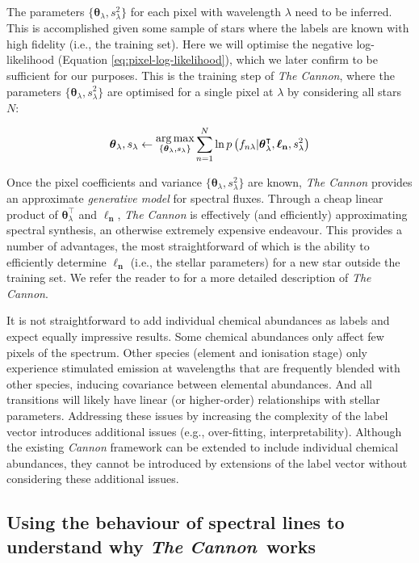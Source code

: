 \documentclass[useAMS,usenatbib]{mn2e}
\newcommand\tc{\textit{The Cannon}}
\newcommand\lv{\mathbf{\boldsymbol\ell_n}}
\newcommand\cv{{\boldsymbol\theta}_\lambda}
\newcommand\given{|}
\newcommand{\set}[1]{$\{#1\}$}
\begin{document}
The parameters \set{\cv,s_\lambda^2} for each pixel with wavelength $\lambda$
need to be inferred. This is accomplished given some sample of stars where 
the labels are known with high fidelity (i.e., the training set). Here we will 
optimise the negative log-likelihood (Equation \ref{eq:pixel-log-likelihood}),
which we later confirm to be sufficient for our purposes. This is the training 
step of \tc{}, where the parameters \set{\cv,s_\lambda^2} are optimised 
for a single pixel at $\lambda$ by considering all stars $N$:


\begin{equation}
\cv,s_\lambda \leftarrow \substack{\mbox{arg\,max}\\{\{\cv , s_\lambda\}}} \sum_{n=1}^N \ln{p}\left(f_{n\lambda}\given\cv^\intercal,\lv,s_\lambda^2\right)
\end{equation}

Once the pixel coefficients and variance \set{\cv, s_\lambda^2} are known,
\tc{} provides an approximate \textit{generative model} for spectral fluxes. 
Through a cheap linear product of $\cv^\intercal$ and $\lv$, \tc{} is 
effectively (and efficiently) approximating spectral synthesis, an otherwise
extremely expensive endeavour. This provides a number of advantages,
the most straightforward of which is the ability to efficiently determine $\lv$
(i.e., the stellar parameters) for a new star outside the training set. We refer
the reader to \citet{Ness15a} for a more detailed description of \tc{}. 

It is not straightforward to add individual chemical abundances as labels and
expect equally impressive results.  Some chemical abundances only affect few
pixels of the spectrum. Other species (element and ionisation stage) only
experience stimulated emission at wavelengths that are frequently blended
with other species, inducing covariance between elemental abundances.
And all transitions will likely have linear (or higher-order) relationships with
stellar parameters.  Addressing these issues by increasing the complexity 
of the label vector introduces additional issues (e.g., over-fitting, interpretability).
Although the existing \textit{Cannon} framework can be extended to include
individual chemical abundances, they cannot be introduced by extensions 
of the label vector without considering these additional issues.

\subsection{Using the behaviour of spectral lines to understand why \tc\ works}
\end{document}
